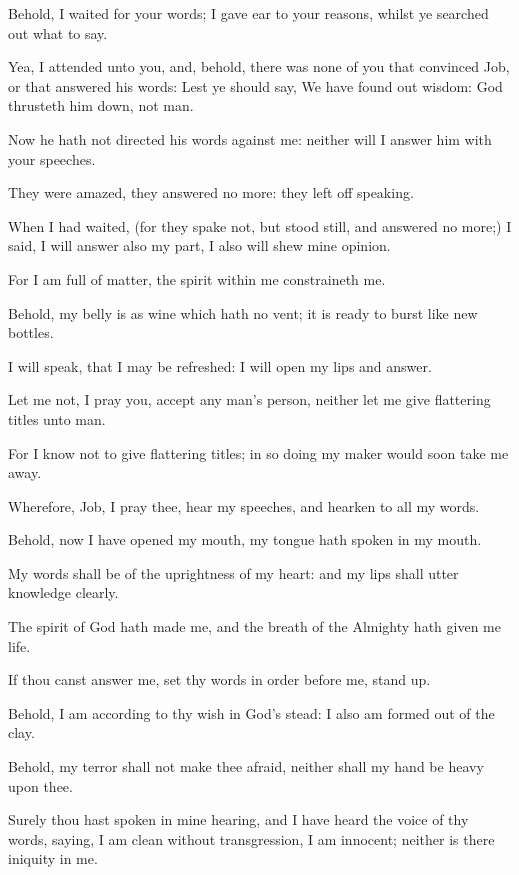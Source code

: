\Verse Behold, I waited for your words; I gave ear to your reasons, whilst ye searched out what to say.

\Verse Yea, I attended unto you, and, behold, there was none of you that convinced Job, or that answered his words: \Verse Lest ye should say, We have found out wisdom: God thrusteth him down, not man.

\Verse Now he hath not directed his words against me: neither will I answer him with your speeches.

\Verse They were amazed, they answered no more: they left off speaking.

\Verse When I had waited, (for they spake not, but stood still, and answered no more;) \Verse I said, I will answer also my part, I also will shew mine opinion.

\Verse For I am full of matter, the spirit within me constraineth me.

\Verse Behold, my belly is as wine which hath no vent; it is ready to burst like new bottles.

\Verse I will speak, that I may be refreshed: I will open my lips and answer.

\Verse Let me not, I pray you, accept any man's person, neither let me give flattering titles unto man.

\Verse For I know not to give flattering titles; in so doing my maker would soon take me away.


\Chapter
\Verse Wherefore, Job, I pray thee, hear my speeches, and hearken to all my words.

\Verse Behold, now I have opened my mouth, my tongue hath spoken in my mouth.

\Verse My words shall be of the uprightness of my heart: and my lips shall utter knowledge clearly.

\Verse The spirit of God hath made me, and the breath of the Almighty hath given me life.

\Verse If thou canst answer me, set thy words in order before me, stand up.

\Verse Behold, I am according to thy wish in God's stead: I also am formed out of the clay.

\Verse Behold, my terror shall not make thee afraid, neither shall my hand be heavy upon thee.

\Verse Surely thou hast spoken in mine hearing, and I have heard the voice of thy words, saying, \Verse I am clean without transgression, I am innocent; neither is there iniquity in me.

